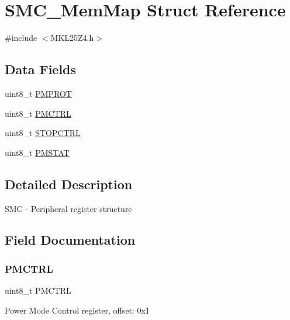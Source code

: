 \hypertarget{struct_s_m_c___mem_map}{}\section{S\+M\+C\+\_\+\+Mem\+Map Struct Reference}
\label{struct_s_m_c___mem_map}


{\ttfamily \#include $<$M\+K\+L25\+Z4.\+h$>$}

\subsection*{Data Fields}
\begin{DoxyCompactItemize}
\item 
uint8\+\_\+t \hyperlink{struct_s_m_c___mem_map_a0e48ca7c949ba2fd2f9a29f153ee1245}{P\+M\+P\+R\+OT}
\item 
uint8\+\_\+t \hyperlink{struct_s_m_c___mem_map_acc989af655daf69d506fde822f207e0c}{P\+M\+C\+T\+RL}
\item 
uint8\+\_\+t \hyperlink{struct_s_m_c___mem_map_a2873244428756490bbc28c84e2161d73}{S\+T\+O\+P\+C\+T\+RL}
\item 
uint8\+\_\+t \hyperlink{struct_s_m_c___mem_map_adacbe2d7cc2808682b7b83e091b850a8}{P\+M\+S\+T\+AT}
\end{DoxyCompactItemize}


\subsection{Detailed Description}
S\+MC -\/ Peripheral register structure 

\subsection{Field Documentation}
\mbox{\label{struct_s_m_c___mem_map_acc989af655daf69d506fde822f207e0c}} 
\subsubsection{\texorpdfstring{P\+M\+C\+T\+RL}{PMCTRL}}
{\footnotesize\ttfamily uint8\+\_\+t P\+M\+C\+T\+RL}

Power Mode Control register, offset\+: 0x1 \mbox{\label{struct_s_m_c___mem_map_a0e48ca7c949ba2fd2f9a29f153ee1245}} 
